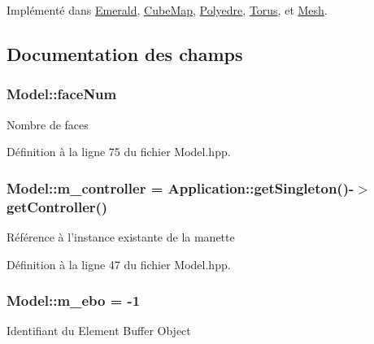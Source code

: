 Implémenté dans \hyperlink{classEmerald_ad997fe3bf39eb0556aefab1a91836895}{Emerald}, \hyperlink{classCubeMap_af4766b5a5fafe3ce6e2cd8905b192d1c}{Cube\+Map}, \hyperlink{classPolyedre_a9ea5863ed9ee46c090e5dbafeda0ef73}{Polyedre}, \hyperlink{classTorus_ac63e15f0274b1beb5e8f7f968c2ac69f}{Torus}, et \hyperlink{classMesh_abb6110295efe8ae479659e46553c952a}{Mesh}.



\subsection{Documentation des champs}
\hypertarget{classModel_a6552e6870c67e02fba57b86a09859b91}{
\subsubsection[{face\+Num}]{\setlength{\rightskip}{0pt plus 5cm}Model\+::face\+Num\hspace{0.3cm}{\ttfamily [protected]}}}\label{classModel_a6552e6870c67e02fba57b86a09859b91}
{\ttfamily Nombre} de faces 

Définition à la ligne 75 du fichier Model.\+hpp.

\hypertarget{classModel_aa952b1556f55b93129bef6e5de91b2b0}{
\subsubsection[{m\+\_\+controller}]{\setlength{\rightskip}{0pt plus 5cm}Model\+::m\+\_\+controller = {\bf Application\+::get\+Singleton}()-\/$>$get\+Controller()\hspace{0.3cm}{\ttfamily [protected]}}}\label{classModel_aa952b1556f55b93129bef6e5de91b2b0}
Référence à l'instance existante de la manette 

Définition à la ligne 47 du fichier Model.\+hpp.

\hypertarget{classModel_a56668d2e99c519c8dbe00c3aab4f7d09}{
\subsubsection[{m\+\_\+ebo}]{\setlength{\rightskip}{0pt plus 5cm}Model\+::m\+\_\+ebo = -\/1\hspace{0.3cm}{\ttfamily [protected]}}}\label{classModel_a56668d2e99c519c8dbe00c3aab4f7d09}
{\ttfamily Identifiant} du Element Buffer Object 

